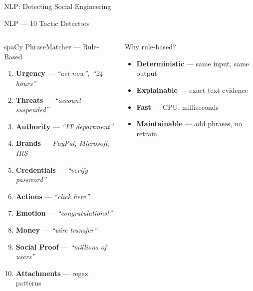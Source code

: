 \documentclass[aspectratio=169,10pt]{beamer}
\begin{document}
\begin{frame}[standout]
  \Large NLP: Detecting Social Engineering
\end{frame}

\begin{frame}{NLP — 10 Tactic Detectors}
  \vspace{0.3cm}
  \begin{columns}[T]
      \begin{block}{spaCy PhraseMatcher — Rule-Based}
        \begin{enumerate}
          \setlength{\itemsep}{0.3em}
          \item \textbf{Urgency} — \textit{``act now'', ``24 hours''}
          \item \textbf{Threats} — \textit{``account suspended''}
          \item \textbf{Authority} — \textit{``IT department''}
          \item \textbf{Brands} — \textit{PayPal, Microsoft, IRS}
          \item \textbf{Credentials} — \textit{``verify password''}
          \item \textbf{Actions} — \textit{``click here''}
          \item \textbf{Emotion} — \textit{``congratulations!''}
          \item \textbf{Money} — \textit{``wire transfer''}
          \item \textbf{Social Proof} — \textit{``millions of users''}
          \item \textbf{Attachments} — regex patterns
        \end{enumerate}
      \end{block}
      \vspace{0.3cm}
      \begin{exampleblock}{Why rule-based?}
        \begin{itemize}
          \setlength{\itemsep}{0.3em}
          \item \textbf{Deterministic} — same input, same output
          \item \textbf{Explainable} — exact text evidence
          \item \textbf{Fast} — CPU, milliseconds
          \item \textbf{Maintainable} — add phrases, no retrain

\end{itemize}
\end{exampleblock}
\end{columns}
\end{frame}
\end{document}
